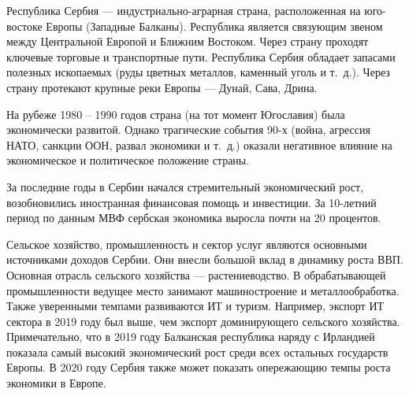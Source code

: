 \Introduction

Республика Сербия --- индустриально-аграрная страна, расположенная на юго-востоке Европы (Западные Балканы).
Республика является связующим звеном между Центральной Европой и Ближним Востоком.
Через страну проходят ключевые торговые и транспортные пути.
Республика Сербия обладает запасами полезных ископаемых (руды цветных металлов, каменный уголь и т.~д.).
Через страну протекают крупные реки Европы --- Дунай, Сава, Дрина.

На рубеже 1980 -- 1990 годов страна (на тот момент Югославия) была экономически развитой.
Однако трагические события 90-х (война, агрессия НАТО, санкции ООН, развал экономики и т.~д.) оказали негативное влияние на экономическое и политическое положение страны.

За последние годы в Сербии начался стремительный экономический рост, возобновились иностранная финансовая помощь и инвестиции.
За 10-летний период по данным МВФ сербская экономика выросла почти на 20 процентов.

Сельское хозяйство, промышленность и сектор услуг являются основными источниками доходов Сербии.
Они внесли большой вклад в динамику роста ВВП.
Основная отрасль сельского хозяйства --- растениеводство.
В обрабатывающей промышленности ведущее место занимают машиностроение и металлообработка.
Также уверенными темпами развиваются ИТ и туризм.
Например, экспорт ИТ сектора в 2019 году был выше, чем экспорт доминирующего сельского хозяйства.
Примечательно, что в 2019 году Балканская республика наряду с Ирландией показала самый высокий экономический рост среди всех остальных государств Европы.
В 2020 году Сербия также может показать опережающию темпы роста экономики в Европе.
